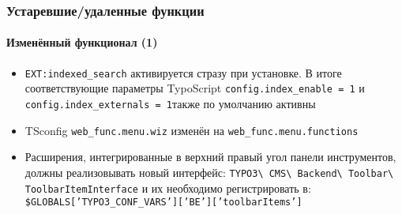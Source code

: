 \begin{frame}[fragile]
	\frametitle{Устаревшие/удаленные функции}
	\framesubtitle{Изменённый функционал (1)}

	\begin{itemize}

		\item \texttt{EXT:indexed\_search} активируется стразу при установке.
			В итоге соответствующие параметры TypoScript \small\texttt{config.index\_enable = 1}\normalsize
			и \small\texttt{config.index\_externals = 1}\normalsize также по умолчанию активны

		\item TSconfig \small\texttt{web\_func.menu.wiz}\normalsize\space
			изменён на \small\texttt{web\_func.menu.functions}\normalsize

		\item Расширения, интегрированные в верхний правый угол панели инструментов, должны реализовывать новый интерфейс:
			\small
				\texttt{TYPO3\textbackslash
					CMS\textbackslash
					Backend\textbackslash
					Toolbar\textbackslash
					ToolbarItemInterface}
			\normalsize\newline
			и их необходимо регистрировать в:
			\small
				\texttt{\$GLOBALS['TYPO3\_CONF\_VARS']['BE']['toolbarItems']}
			\normalsize

	\end{itemize}

\end{frame}


